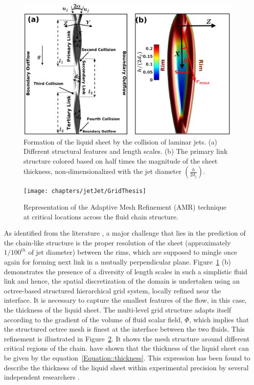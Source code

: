 \begin{figure}
	\centering
	\includegraphics[width=\textwidth]{chapters/jetJet/Figure1}
	\caption{Formation of the liquid sheet by the collision of laminar jets. (a) Different structural features and length scales. (b) The primary link structure colored based on half times the magnitude of the sheet thickness, non-dimensionalized with the jet diameter $\left(\frac{h}{2d_j}\right)$.}
	\label{Figure::schematic}
\end{figure}
\begin{figure}
	\centering
	\texttt{[image: chapters/jetJet/GridThesis]}
	\caption{Representation of the Adaptive Mesh Refinement (AMR) technique at critical locations across the fluid chain structure.}
	\label{Figure::gisetal1}
\end{figure}
As identified from the literature \citep{chen2013high,zhang2017effects}, a major challenge that lies in the prediction of the chain-like structure is the proper resolution of the sheet (approximately $1/100^{th}$ of jet diameter) between the rims, which are supposed to mingle once again for forming next link in a mutually perpendicular plane. Figure~\ref{Figure::schematic} (b) demonstrates the presence of a diversity of length scales in such a simplistic fluid link and hence, the spatial discretization of the domain is undertaken using an octree-based structured hierarchical grid system, locally refined near the interface. It is necessary to capture the smallest features of the flow, in this case, the thickness of the liquid sheet. The multi-level grid structure adapts itself according to the gradient of the volume of fluid scalar field, $\Phi$, which implies that the structured octree mesh is finest at the interface between the two fluids. This refinement is illustrated in Figure~\ref{Figure::gisetal1}. It shows the mesh structure around different critical regions of the chain. \citet{hasson1964thickness,choo2001parametric} have shown that the thickness of the liquid sheet can be given by the equation~\ref{Equation::thickness}. This expression has been found to describe the thickness of the liquid sheet within experimental precision by several independent researchers \citep{poulikakos1998thickness,choo2001parametric,ekimova2015liquid}.
